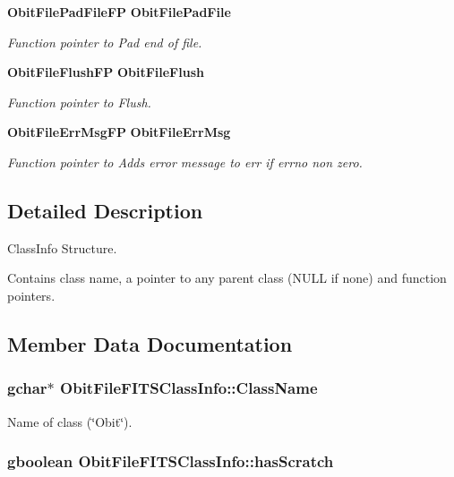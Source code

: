 \begin{CompactItemize}
{\bf Obit\-File\-Pad\-File\-FP} {\bf Obit\-File\-Pad\-File}
\begin{CompactList}\small\item\em Function pointer to Pad end of file. \item\end{CompactList}\item 
{\bf Obit\-File\-Flush\-FP} {\bf Obit\-File\-Flush}
\begin{CompactList}\small\item\em Function pointer to Flush. \item\end{CompactList}\item 
{\bf Obit\-File\-Err\-Msg\-FP} {\bf Obit\-File\-Err\-Msg}
\begin{CompactList}\small\item\em Function pointer to Adds error message to err if errno non zero. \item\end{CompactList}\end{CompactItemize}


\subsection{Detailed Description}
Class\-Info Structure. 

Contains class name, a pointer to any parent class (NULL if none) and function pointers. 



\subsection{Member Data Documentation}
\subsubsection{\setlength{\rightskip}{0pt plus 5cm}gchar$\ast$ {\bf Obit\-File\-FITSClass\-Info::Class\-Name}}\label{structObitFileFITSClassInfo_o2}


Name of class (\char`\"{}Obit\char`\"{}). 

\subsubsection{\setlength{\rightskip}{0pt plus 5cm}gboolean {\bf Obit\-File\-FITSClass\-Info::has\-Scratch}}\label{structObitFileFITSClassInfo_o1}


